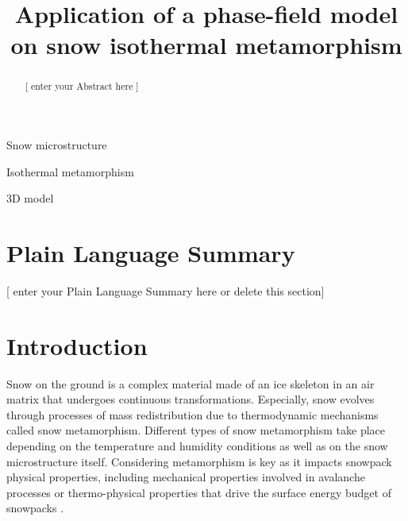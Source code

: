 \documentclass[draft,ms]{agujournal2019}
\begin{document}
\title{Application of a phase-field model on snow isothermal metamorphism}







\begin{keypoints}
\item Snow microstructure
\item Isothermal metamorphism
\item 3D model
\end{keypoints}


\begin{abstract}
[ enter your Abstract here ]
\end{abstract}

\section*{Plain Language Summary}
[ enter your Plain Language Summary here or delete this section]



\section{Introduction}
\label{sec:intro}
Snow on the ground is a complex material made of an ice skeleton in an air matrix that undergoes continuous transformations. Especially, snow evolves through processes of mass redistribution due to thermodynamic mechanisms called snow metamorphism. Different types of snow metamorphism take place depending on the temperature and humidity conditions as well as on the snow microstructure itself. Considering metamorphism is key as it impacts snowpack physical properties, including mechanical properties involved in avalanche processes or thermo-physical properties that drive the surface energy budget of snowpacks \cite{vionnet_detailed_2012, lehning_physical_2002}.\\
\end{document}
